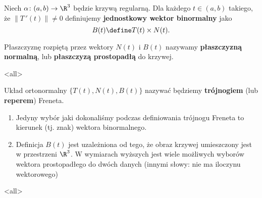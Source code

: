 \begin{frame}

\begin{definicja}
Niech $\alpha\colon (a,b)\to \R^3$ będzie krzywą regularną. Dla każdego $t\in (a,b)$ takiego, że $\|T\,'(t)\|\neq 0$ definiujemy \textbf{jednostkowy wektor binormalny} jako \[B(t)\define T(t)\times N(t).\]

\pause Płaszczyznę rozpiętą przez wektory $N(t)$ i $B(t)$ nazywamy \textbf{płaszczyzną normalną}, lub \textbf{płaszczyzą prostopadłą} do krzywej.
\end{definicja}


\end{frame}
\mode<all>{}
\begin{frame}[<+->]

\begin{definicja}
Układ ortonormalny $\{T(t),N(t),B(t)\}$ nazywać będziemy \textbf{trójnogiem} (lub \textbf{reperem}) Freneta.
\end{definicja}

\begin{center}
\begin{tikzpicture}[y=0.80pt, x=0.8pt,scale=0.5,yscale=-1, inner sep=0pt, outer sep=0pt]

\end{tikzpicture}
\end{center}


\end{frame}
\begin{uwaga}
\begin{enumerate}
\item Jedyny wybór jaki dokonaliśmy podczas definiowania trójnogu Freneta to kierunek (tj. znak) wektora binormalnego.
\item Definicja $B(t)$ jest uzależniona od tego, że obraz krzywej umieszczony jest w przestrzeni $\R^3$. W wymiarach wyższych jest wiele możliwych wyborów wektora prostopadłego do dwóch danych (innymi słowy: nie ma iloczynu wektorowego)
\end{enumerate}
\end{uwaga}


\mode<all> 
